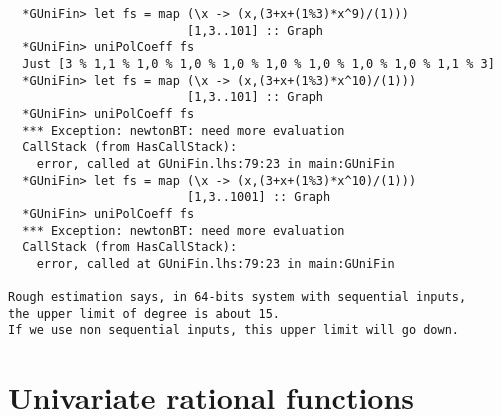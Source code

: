 \documentclass[11pt]{book}
\begin{document}
\begin{verbatim}
  *GUniFin> let fs = map (\x -> (x,(3+x+(1%3)*x^9)/(1))) 
                         [1,3..101] :: Graph
  *GUniFin> uniPolCoeff fs
  Just [3 % 1,1 % 1,0 % 1,0 % 1,0 % 1,0 % 1,0 % 1,0 % 1,0 % 1,1 % 3]
  *GUniFin> let fs = map (\x -> (x,(3+x+(1%3)*x^10)/(1))) 
                         [1,3..101] :: Graph
  *GUniFin> uniPolCoeff fs
  *** Exception: newtonBT: need more evaluation
  CallStack (from HasCallStack):
    error, called at GUniFin.lhs:79:23 in main:GUniFin
  *GUniFin> let fs = map (\x -> (x,(3+x+(1%3)*x^10)/(1))) 
                         [1,3..1001] :: Graph
  *GUniFin> uniPolCoeff fs
  *** Exception: newtonBT: need more evaluation
  CallStack (from HasCallStack):
    error, called at GUniFin.lhs:79:23 in main:GUniFin

Rough estimation says, in 64-bits system with sequential inputs,
the upper limit of degree is about 15.
If we use non sequential inputs, this upper limit will go down.
\end{verbatim}

\section{Univariate rational functions}
\end{document}
